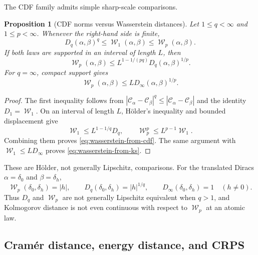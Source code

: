 \documentclass[11pt]{article}
\newtheorem{proposition}[theorem]{Proposition}
\newcommand{\al}{\alpha}
\newcommand{\be}{\beta}
\newcommand{\de}{\delta}
\newcommand{\Cc}{\mathcal C}
\newcommand{\cumul}[1]{\Cc_{#1}}
\DeclareMathOperator{\Wass}{\mathcal W}
\begin{document}
The CDF family admits simple sharp-scale comparisons.

\begin{proposition}[CDF norms versus Wasserstein distances]
\label{prop:cdf-wasserstein-comparison}
Let $1\leq q<\infty$ and $1\leq p<\infty$.  Whenever the right-hand side is
finite,
\begin{equation}\label{eq:cdf-from-wasserstein}
 D_q(\al,\be)^q\leq \Wass_1(\al,\be)\leq\Wass_p(\al,\be).
\end{equation}
If both laws are supported in an interval of length $L$, then
\begin{equation}\label{eq:wasserstein-from-cdf}
 \Wass_p(\al,\be)
 \leq L^{1-1/(pq)}D_q(\al,\be)^{1/p}.
\end{equation}
For $q=\infty$, compact support gives
\begin{equation}\label{eq:wasserstein-from-ks}
 \Wass_p(\al,\be)\leq L D_\infty(\al,\be)^{1/p}.
\end{equation}
\end{proposition}

\begin{proof}
The first inequality follows from $|\cumul{\al}-\cumul{\be}|^q\leq
|\cumul{\al}-\cumul{\be}|$ and the identity $D_1=\Wass_1$.  On an interval of length
$L$, H\"older's inequality and bounded displacement give
\[
 \Wass_1\leq L^{1-1/q}D_q,
 \qquad
 \Wass_p^p\leq L^{p-1}\Wass_1.
\]
Combining them proves \eqref{eq:wasserstein-from-cdf}.  The same argument with
$\Wass_1\leq L D_\infty$ proves \eqref{eq:wasserstein-from-ks}.
\end{proof}

These are H\"older, not generally Lipschitz, comparisons.  For the translated
Diracs $\al=\de_0$ and $\be=\de_h$,
\begin{equation}\label{eq:dirac-shift-signatures}
 \Wass_p(\de_0,\de_h)=|h|,
 \qquad
 D_q(\de_0,\de_h)=|h|^{1/q},
 \qquad
 D_\infty(\de_0,\de_h)=1
 \quad(h\neq0).
\end{equation}
Thus $D_q$ and $\Wass_p$ are not generally Lipschitz equivalent when $q>1$, and
Kolmogorov distance is not even continuous with respect to $\Wass_p$ at an
atomic law.

\subsection{Cram\'er distance, energy distance, and CRPS}
\end{document}
